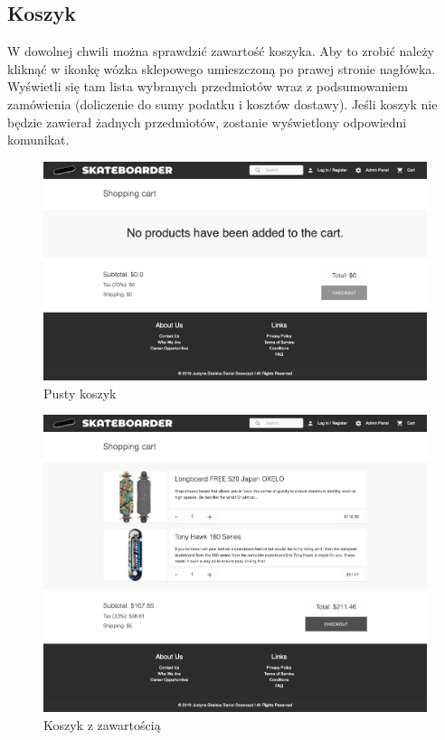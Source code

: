 \documentclass[12pt,a4paper,titlepage]{article}
\begin{document}
\subsection{Koszyk}
W dowolnej chwili można sprawdzić zawartość koszyka. Aby to zrobić należy kliknąć w ikonkę wózka sklepowego umieszczoną po prawej stronie nagłówka. Wyświetli się tam lista wybranych przedmiotów wraz z podsumowaniem zamówienia (doliczenie do sumy podatku i kosztów dostawy). Jeśli koszyk nie będzie zawierał żadnych przedmiotów, zostanie wyświetlony odpowiedni komunikat. 
\begin{figure}[H]
    \centering
    \includegraphics[width=13cm]{Pics/cart2.png}
    \caption{Pusty koszyk}
    \label{pic:cartEmpty}
\end{figure}
\begin{figure}[H]
    \centering
    \includegraphics[width=13cm]{Pics/cart3.png}
    \caption{Koszyk z zawartością}
    \label{pic:cartFull}
\end{figure}
\end{document}
